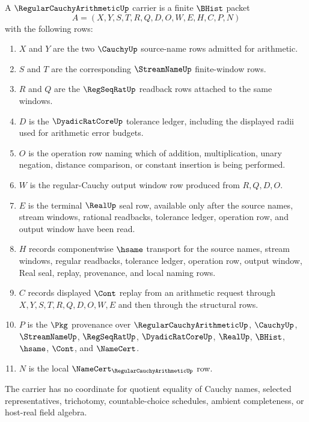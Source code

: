 \begin{definition}
\label{def:regular-cauchy-arithmetic-carrier}
A $\RegularCauchyArithmeticUp$ carrier is a finite $\BHist$ packet
$$
A=(X,Y,S,T,R,Q,D,O,W,E,H,C,P,N)
$$
with the following rows:
\begin{enumerate}
\item $X$ and $Y$ are the two $\CauchyUp$ source-name rows admitted for arithmetic.
\item $S$ and $T$ are the corresponding $\StreamNameUp$ finite-window rows.
\item $R$ and $Q$ are the $\RegSeqRatUp$ readback rows attached to the same windows.
\item $D$ is the $\DyadicRatCoreUp$ tolerance ledger, including the displayed radii used for arithmetic error budgets.
\item $O$ is the operation row naming which of addition, multiplication, unary negation, distance comparison, or constant insertion is being performed.
\item $W$ is the regular-Cauchy output window row produced from $R,Q,D,O$.
\item $E$ is the terminal $\RealUp$ seal row, available only after the source names, stream windows, rational readbacks, tolerance ledger, operation row, and output window have been read.
\item $H$ records componentwise $\hsame$ transport for the source names, stream windows, regular readbacks, tolerance ledger, operation row, output window, Real seal, replay, provenance, and local naming rows.
\item $C$ records displayed $\Cont$ replay from an arithmetic request through $X,Y,S,T,R,Q,D,O,W,E$ and then through the structural rows.
\item $P$ is the $\Pkg$ provenance over $\RegularCauchyArithmeticUp$, $\CauchyUp$, $\StreamNameUp$, $\RegSeqRatUp$, $\DyadicRatCoreUp$, $\RealUp$, $\BHist$, $\hsame$, $\Cont$, and $\NameCert$.
\item $N$ is the local $\NameCert_{\RegularCauchyArithmeticUp}$ row.
\end{enumerate}
The carrier has no coordinate for quotient equality of Cauchy names, selected representatives, trichotomy, countable-choice schedules, ambient completeness, or host-real field algebra.
\end{definition}

